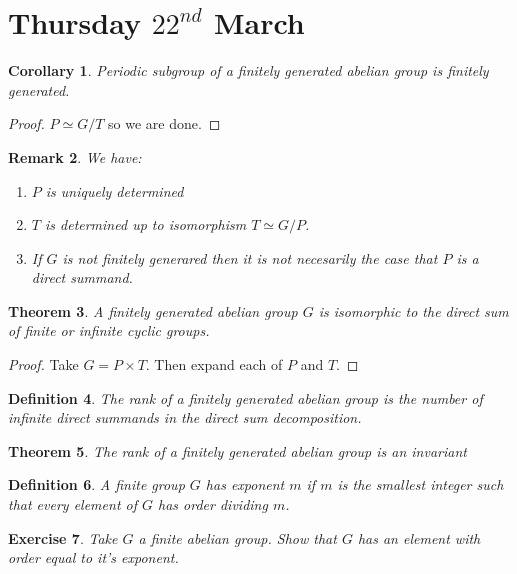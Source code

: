 \documentclass[a4paper,10pt]{article}
\newtheorem{thm}{Theorem}
\newtheorem{Def}[thm]{Definition}
\newtheorem{Cor}[thm]{Corollary}
\newtheorem{Ex}[thm]{Exercise}
\newtheorem{rem}[thm]{Remark}
\begin{document}
\newpage
\section{Thursday $22^{nd}$ March}

\begin{Cor}
Periodic subgroup of a finitely generated abelian group is finitely generated. 
\end{Cor}
\begin{proof}
$P \simeq G / T$ so we are done. 
\end{proof}


\begin{rem}
We have:
\begin{enumerate} 
\item $P$ is uniquely determined
\item $T$ is determined up to isomorphism $ T \simeq G / P$. 
\item If $G$ is not finitely generared then it is not necesarily the case that $P$ is a direct summand.
\end{enumerate}

\end{rem}

\begin{thm}
A finitely generated abelian group $G$ is isomorphic to the direct sum of finite or infinite cyclic groups.
\end{thm}

\begin{proof}
Take $G = P \times T$. Then expand each of $P$ and $T$. 
\end{proof}

\begin{Def}
The rank of a finitely generated abelian group is the number of infinite direct summands in the direct sum decomposition. 
\end{Def}

\begin{thm}
The rank of a finitely generated abelian group is an invariant
\end{thm}

\begin{Def}
A finite group $G$ has exponent $m$ if $m$ is the smallest integer such that every element of $G$ has order dividing $m$. 
\end{Def}

\begin{Ex}
Take $G$ a finite abelian group. Show that $G$ has an element with order equal to it's exponent.
\end{Ex}
\end{document}
